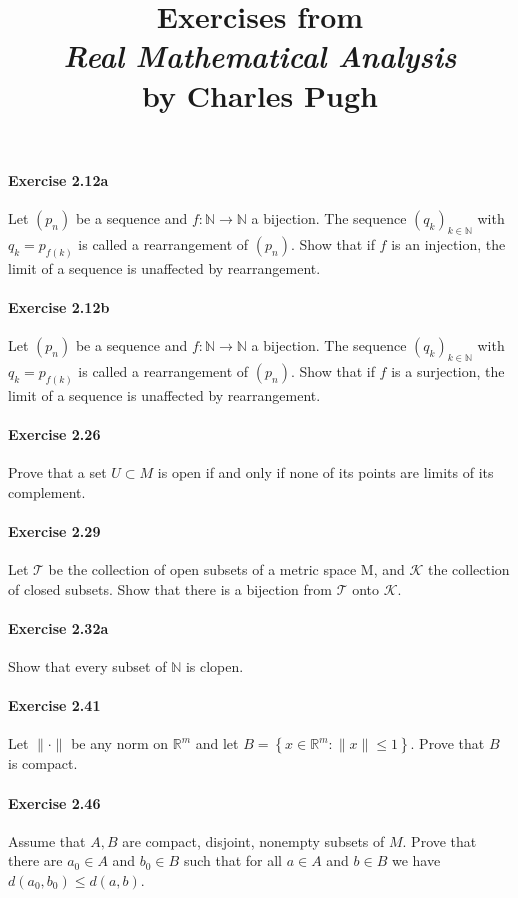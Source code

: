 \documentclass{article}
\title{\textbf{
Exercises from \\
\textit{Real Mathematical Analysis} \\
by Charles Pugh
}}
\date{}
\begin{document}
\maketitle


\paragraph{Exercise 2.12a} Let $(p_n)$ be a sequence and $f:\mathbb{N}\to\mathbb{N}$ a bijection. The sequence $(q_k)_{k\in\mathbb{N}}$ with $q_k=p_{f(k)}$ is called a rearrangement of $(p_n)$. Show that if $f$ is an injection, the limit of a sequence is unaffected by rearrangement.

\paragraph{Exercise 2.12b} Let $(p_n)$ be a sequence and $f:\mathbb{N}\to\mathbb{N}$ a bijection. The sequence $(q_k)_{k\in\mathbb{N}}$ with $q_k=p_{f(k)}$ is called a rearrangement of $(p_n)$. Show that if $f$ is a surjection, the limit of a sequence is unaffected by rearrangement.

\paragraph{Exercise 2.26} Prove that a set $U \subset M$ is open if and only if none of its points are limits of its complement.

\paragraph{Exercise 2.29} Let $\mathcal{T}$ be the collection of open subsets of a metric space $\mathrm{M}$, and $\mathcal{K}$ the collection of closed subsets. Show that there is a bijection from $\mathcal{T}$ onto $\mathcal{K}$.

\paragraph{Exercise 2.32a} Show that every subset of $\mathbb{N}$ is clopen.

\paragraph{Exercise 2.41} Let $\|\cdot\|$ be any norm on $\mathbb{R}^{m}$ and let $B=\left\{x \in \mathbb{R}^{m}:\|x\| \leq 1\right\}$. Prove that $B$ is compact.

\paragraph{Exercise 2.46} Assume that $A, B$ are compact, disjoint, nonempty subsets of $M$. Prove that there are $a_0 \in A$ and $b_0 \in B$ such that for all $a \in A$ and $b \in B$ we have $d(a_0, b_0) \leq d(a, b)$.
\end{document}
